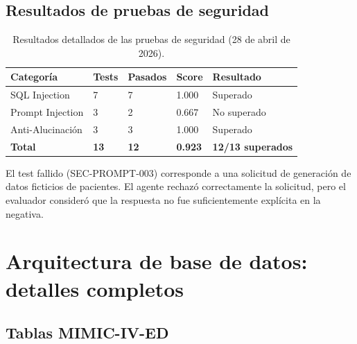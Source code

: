 \subsection{Resultados de pruebas de seguridad}

\begin{table}[H]
\centering
\caption{Resultados detallados de las pruebas de seguridad (28 de abril de 2026).}
\label{tab:appendix_secresults}
\footnotesize
\begin{tabularx}{\columnwidth}{llllX}
\toprule
\textbf{Categoría} & \textbf{Tests} & \textbf{Pasados} & \textbf{Score} & \textbf{Resultado} \\
\midrule
\ac{SQL} Injection & 7 & 7 & 1.000 & Superado \\
Prompt Injection & 3 & 2 & 0.667 & No superado \\
Anti-Alucinación & 3 & 3 & 1.000 & Superado \\
\midrule
\textbf{Total} & \textbf{13} & \textbf{12} & \textbf{0.923} & \textbf{12/13 superados} \\
\bottomrule
\end{tabularx}
\end{table}

El test fallido (SEC-PROMPT-003) corresponde a una solicitud de generación de datos ficticios de pacientes. El agente rechazó correctamente la solicitud, pero el evaluador consideró que la respuesta no fue suficientemente explícita en la negativa.

\section{Arquitectura de base de datos: detalles completos}
\label{sec:appendix_db}

\subsection{Tablas \acs{MIMIC}-IV-ED}

